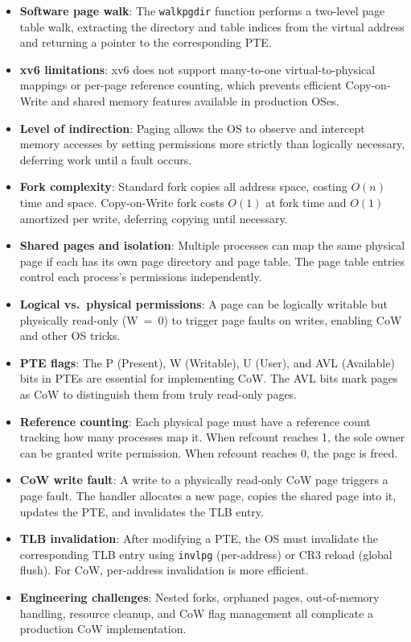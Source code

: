 \documentclass[11pt]{article}
\begin{document}
\begin{itemize}
    \item \textbf{Software page walk}: The \texttt{walkpgdir} function performs a two-level page table walk, extracting the directory and table indices from the virtual address and returning a pointer to the corresponding PTE.

    \item \textbf{xv6 limitations}: xv6 does not support many-to-one virtual-to-physical mappings or per-page reference counting, which prevents efficient Copy-on-Write and shared memory features available in production OSes.

    \item \textbf{Level of indirection}: Paging allows the OS to observe and intercept memory accesses by setting permissions more strictly than logically necessary, deferring work until a fault occurs.

    \item \textbf{Fork complexity}: Standard fork copies all address space, costing $O(n)$ time and space. Copy-on-Write fork costs $O(1)$ at fork time and $O(1)$ amortized per write, deferring copying until necessary.

    \item \textbf{Shared pages and isolation}: Multiple processes can map the same physical page if each has its own page directory and page table. The page table entries control each process's permissions independently.

    \item \textbf{Logical vs.\ physical permissions}: A page can be logically writable but physically read-only (W~=~0) to trigger page faults on writes, enabling CoW and other OS tricks.

    \item \textbf{PTE flags}: The P (Present), W (Writable), U (User), and AVL (Available) bits in PTEs are essential for implementing CoW. The AVL bits mark pages as CoW to distinguish them from truly read-only pages.

    \item \textbf{Reference counting}: Each physical page must have a reference count tracking how many processes map it. When refcount reaches 1, the sole owner can be granted write permission. When refcount reaches 0, the page is freed.

    \item \textbf{CoW write fault}: A write to a physically read-only CoW page triggers a page fault. The handler allocates a new page, copies the shared page into it, updates the PTE, and invalidates the TLB entry.

    \item \textbf{TLB invalidation}: After modifying a PTE, the OS must invalidate the corresponding TLB entry using \texttt{invlpg} (per-address) or CR3 reload (global flush). For CoW, per-address invalidation is more efficient.

    \item \textbf{Engineering challenges}: Nested forks, orphaned pages, out-of-memory handling, resource cleanup, and CoW flag management all complicate a production CoW implementation.
\end{itemize}
\end{document}
